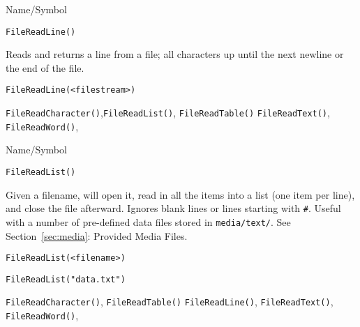 \begin{desc}{Name/Symbol}
\item[Name/Symbol]	\verb+FileReadLine()+

\item[Description]	Reads and returns a line from a file; all characters up
		until the next newline or the end of the file.

\item[Usage]
\begin{verbatim}
FileReadLine(<filestream>)
\end{verbatim}

\item[Example]	

\item[See Also]	

	\verb+FileReadCharacter()+,\verb+FileReadList()+, \verb+FileReadTable()+
	\verb+FileReadText()+, 	\verb+FileReadWord()+,

\end{desc}



\begin{desc}{Name/Symbol}
\item[Name/Symbol]  	\verb+FileReadList()+
 
\item[Description] Given a filename, will open it, read in all the
  items into a list (one item per line), and close the file afterward.
  Ignores blank lines or lines starting with \verb+#+.  Useful with a
  number of pre-defined data files stored in \verb+media/text/+.  See
  Section~\ref{sec:media}: Provided Media Files.

\item[Usage]
\begin{verbatim}
FileReadList(<filename>)
\end{verbatim}

\item[Example]
\begin{verbatim}
FileReadList("data.txt")
\end{verbatim}

\item[See Also]

	\verb+FileReadCharacter()+, \verb+FileReadTable()+
	\verb+FileReadLine()+, 	\verb+FileReadText()+, 	\verb+FileReadWord()+,

\end{desc}

